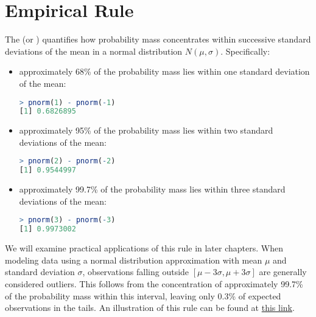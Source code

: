 \section{Empirical Rule}

The  (or ) quantifies how probability mass concentrates within successive standard deviations of the mean in a normal distribution \( N(\mu, \sigma) \).
Specifically:
\begin{itemize}
    \item approximately 68\% of the probability mass lies within one standard deviation of the mean:
    \begin{lstlisting}[language=R]
> pnorm(1) - pnorm(-1)
[1] 0.6826895      
    \end{lstlisting}
    \item approximately 95\% of the probability mass lies within two standard deviations of the mean:
    \begin{lstlisting}[language=R]
> pnorm(2) - pnorm(-2)
[1] 0.9544997
    \end{lstlisting}
    \item approximately 99.7\% of the probability mass lies within three standard deviations of the mean:
    \begin{lstlisting}[language=R]
> pnorm(3) - pnorm(-3)
[1] 0.9973002
    \end{lstlisting}
\end{itemize}
We will examine practical applications of this rule in later chapters.
When modeling data using a normal distribution approximation with mean \( \mu \) and standard deviation \( \sigma \),
observations falling outside \( [\mu - 3\sigma, \mu + 3\sigma] \) are generally considered outliers.
This follows from the concentration of approximately 99.7\% of the probability mass within this interval,
leaving only 0.3\% of expected observations in the tails.
An illustration of this rule can be found at \href{https://andymath.com/normal-distribution-empirical-rule/}{this link}.

